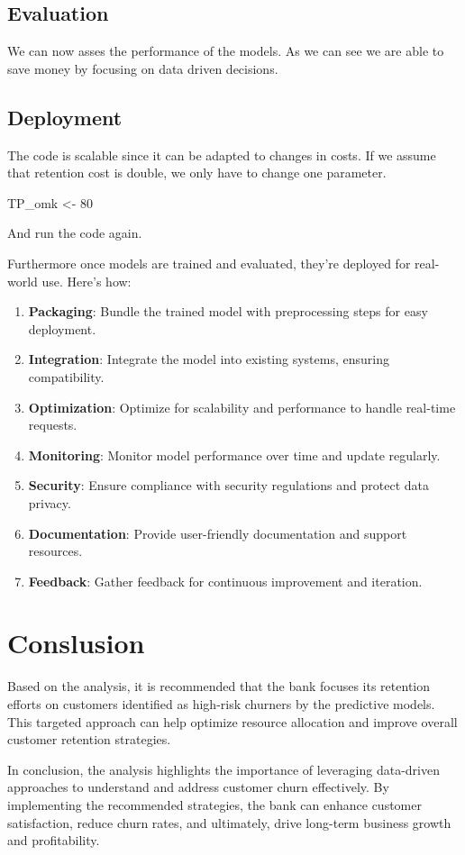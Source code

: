 \documentclass[
  letterpaper,
  DIV=11,
  numbers=noendperiod]{scrartcl}
\newenvironment{Shaded}{\begin{snugshade}}{\end{snugshade}}
\newcommand{\DecValTok}[1]{\textcolor[rgb]{0.68,0.00,0.00}{#1}}
\newcommand{\NormalTok}[1]{\textcolor[rgb]{0.00,0.23,0.31}{#1}}
\newcommand{\OtherTok}[1]{\textcolor[rgb]{0.00,0.23,0.31}{#1}}
\begin{document}
\subsection{Evaluation}\label{evaluation}

We can now asses the performance of the models. As we can see we are
able to save money by focusing on data driven decisions.

\subsection{Deployment}\label{deployment}

The code is scalable since it can be adapted to changes in costs. If we
assume that retention cost is double, we only have to change one
parameter.

\begin{Shaded}
\begin{Highlighting}[]
\NormalTok{TP\_omk }\OtherTok{\textless{}{-}} \DecValTok{80}
\end{Highlighting}
\end{Shaded}

And run the code again.

Furthermore once models are trained and evaluated, they're deployed for
real-world use. Here's how:

\begin{enumerate}
\def\labelenumi{\arabic{enumi}.}
\item
  \textbf{Packaging}: Bundle the trained model with preprocessing steps
  for easy deployment.
\item
  \textbf{Integration}: Integrate the model into existing systems,
  ensuring compatibility.
\item
  \textbf{Optimization}: Optimize for scalability and performance to
  handle real-time requests.
\item
  \textbf{Monitoring}: Monitor model performance over time and update
  regularly.
\item
  \textbf{Security}: Ensure compliance with security regulations and
  protect data privacy.
\item
  \textbf{Documentation}: Provide user-friendly documentation and
  support resources.
\item
  \textbf{Feedback}: Gather feedback for continuous improvement and
  iteration.
\end{enumerate}

\section{Conslusion}\label{conslusion}

Based on the analysis, it is recommended that the bank focuses its
retention efforts on customers identified as high-risk churners by the
predictive models. This targeted approach can help optimize resource
allocation and improve overall customer retention strategies.

In conclusion, the analysis highlights the importance of leveraging
data-driven approaches to understand and address customer churn
effectively. By implementing the recommended strategies, the bank can
enhance customer satisfaction, reduce churn rates, and ultimately, drive
long-term business growth and profitability.
\end{document}
